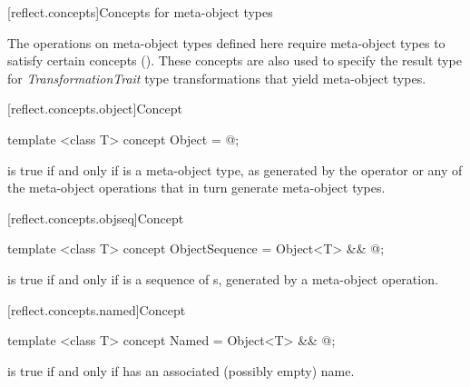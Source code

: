 [reflect.concepts]{Concepts for meta-object types}

\begin{std.txt}\color{addclr}
\pnum
The operations on meta-object types defined here require meta-object types to
satisfy certain concepts (). These concepts are also used to
specify the result type for \emph{TransformationTrait} type transformations that
yield meta-object types.
\end{std.txt}

[reflect.concepts.object]{Concept }

\begin{std.txt}\color{addclr}

\begin{itemdecl}
template <class T> concept Object = @\seebelow@;
\end{itemdecl}

\begin{itemdescr}
\pnum
{} is true if and only if  is a meta-object type, as generated by the  operator or any of the meta-object operations that in turn generate meta-object types.

\end{itemdescr}
\end{std.txt}

[reflect.concepts.objseq]{Concept }
\begin{std.txt}\color{addclr}

\begin{itemdecl}
template <class T> concept ObjectSequence = Object<T> && @\seebelow@;
\end{itemdecl}

\begin{itemdescr}
\pnum
{} is true if and only if  is a sequence of s, generated by a meta-object operation.

\end{itemdescr}
\end{std.txt}

[reflect.concepts.named]{Concept }

\begin{std.txt}\color{addclr}

\begin{itemdecl}
template <class T> concept Named = Object<T> && @\seebelow@;
\end{itemdecl}

\begin{itemdescr}
\pnum
{} is true if and only if  has an associated (possibly empty) name.

\end{itemdescr}
\end{std.txt}

